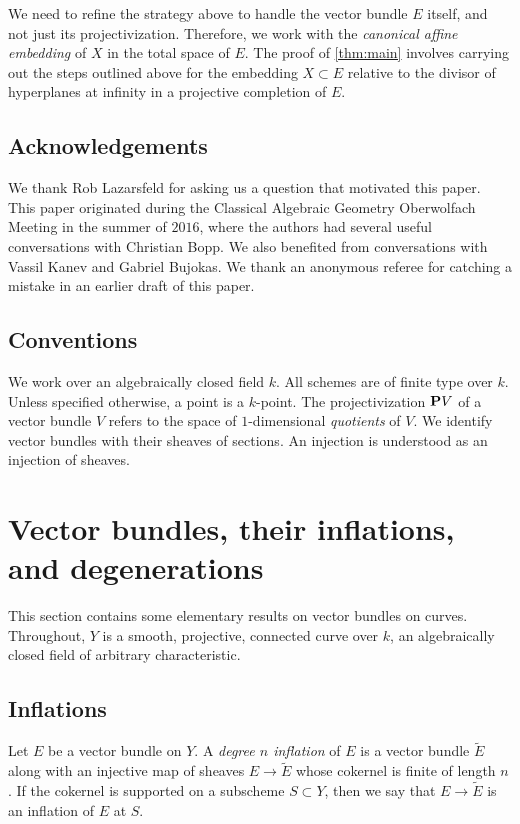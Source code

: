 \documentclass[11 pt]{amsart}
\renewcommand{\k}{k}
\renewcommand {\P}{{\bf P}}
\numberwithin{equation}{section}
\begin{document}
We need to refine the strategy above to handle the vector bundle $E$ itself, and not just its projectivization.
Therefore, we work with the \emph{canonical affine embedding} of $X$ in the total space of $E$.
The proof of \autoref{thm:main} involves carrying out the steps outlined above for the embedding $X \subset E$ relative to the divisor of hyperplanes at infinity in a projective completion of $E$.

\subsection{Acknowledgements}  We thank Rob Lazarsfeld for asking us a question that motivated this paper.
This paper originated during the Classical Algebraic Geometry Oberwolfach Meeting in the summer of $2016$, where the authors had several useful conversations with Christian Bopp. We also benefited from conversations with Vassil Kanev and Gabriel Bujokas.
We thank an anonymous referee for catching a mistake in an earlier draft of this paper.

\subsection{Conventions}
We work over an algebraically closed field $\k$.
All schemes are of finite type over $\k$.
Unless specified otherwise, a point is a $\k$-point.
The projectivization $\P V$ of a vector bundle $V$ refers to the space of $1$-dimensional \emph{quotients} of $V$.
We identify vector bundles with their sheaves of sections.
An injection is understood as an injection of sheaves.

\section{Vector bundles,  their inflations, and degenerations}
This section contains some elementary results on vector bundles on curves.
Throughout, $Y$ is a smooth, projective, connected curve over $\k$, an algebraically closed field of arbitrary characteristic.

\subsection{Inflations}\label{sec:inf}
  Let $E$ be a vector bundle on $Y$.
  A \emph{degree $n$ inflation} of $E$ is a vector bundle $\widetilde E$ along with an injective map of sheaves $E \to \widetilde E$ whose cokernel is finite of length $n$.
  If the cokernel is supported on a subscheme $S \subset Y$, then we say that $E \to \widetilde E$ is an inflation of $E$ at $S$.
  
\end{document}
